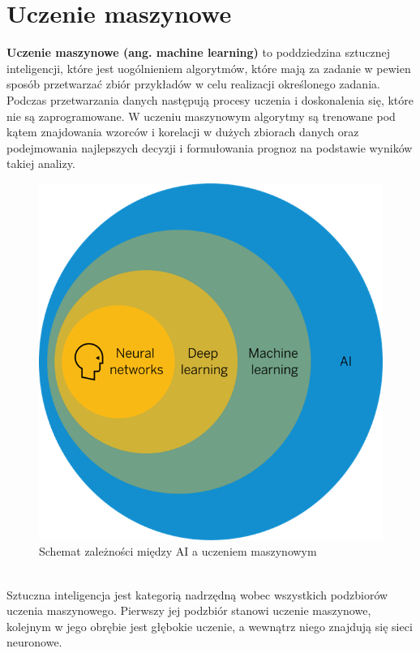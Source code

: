 \documentclass{article}
\begin{document}
\section{Uczenie maszynowe}
\textbf{Uczenie maszynowe (ang. machine learning)} to poddziedzina sztucznej inteligencji, które jest uogólnieniem algorytmów, które mają za zadanie w pewien sposób przetwarzać zbiór przykładów w celu realizacji określonego zadania. Podczas przetwarzania danych następują procesy uczenia i doskonalenia się, które nie są zaprogramowane. W uczeniu maszynowym algorytmy są trenowane pod kątem znajdowania wzorców i korelacji w dużych zbiorach danych oraz podejmowania najlepszych decyzji i formułowania prognoz na podstawie wyników takiej analizy.
\begin{figure}[h]
\caption{Schemat zależności między AI a uczeniem maszynowym}
\includegraphics[scale=0.6]{AIauczeniemaszynowe}
\end{figure}
\\ 
Sztuczna inteligencja jest kategorią nadrzędną wobec wszystkich podzbiorów uczenia maszynowego. Pierwszy jej podzbiór stanowi uczenie maszynowe, kolejnym w jego obrębie jest głębokie uczenie, a wewnątrz niego znajdują się sieci neuronowe.
\pagebreak
\end{document}
